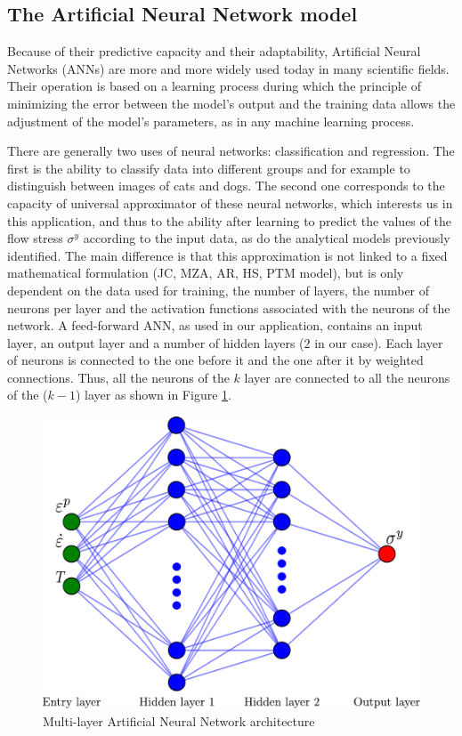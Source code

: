 \documentclass[twoside,english,1p,final,sort&compress]{elsarticle}
\theoremstyle{plain}
\begin{document}
\subsection{The Artificial Neural Network model\label{sec:ANNmodel}}

Because of their predictive capacity and their adaptability, Artificial Neural Networks (ANNs) are more and more widely used today in many scientific fields.
Their operation is based on a learning process during which the principle of minimizing the error between the model's output and the training data allows the adjustment of the model's parameters, as in any machine learning process.

There are generally two uses of neural networks: classification and regression.
The first is the ability to classify data into different groups and for example to distinguish between images of cats and dogs.
The second one corresponds to the capacity of universal approximator of these neural networks, which interests us in this application, and thus to the ability after learning to predict the values of the flow stress $\sigma^y$ according to the input data, as do the analytical models previously identified.
The main difference is that this approximation is not linked to a fixed mathematical formulation (JC, MZA, AR, HS, PTM model), but is only dependent on the data used for training, the number of layers, the number of neurons per layer and the activation functions associated with the neurons of the network.
A feed-forward ANN, as used in our application, contains an input layer, an output layer and a number of hidden layers ($2$ in our case).
Each layer of neurons is connected to the one before it and the one after it by weighted connections.
Thus, all the neurons of the $k$ layer are connected to all the neurons of the ($k-1$) layer as shown in Figure \ref{fig:ANN-2HL}.
\begin{figure}[!ht]
\centering
\includegraphics[width=0.7\columnwidth]
{Figures/ANN-scheme-2HL}
\caption{Multi-layer Artificial Neural Network architecture}
\label{fig:ANN-2HL}
\end{figure}
\end{document}

